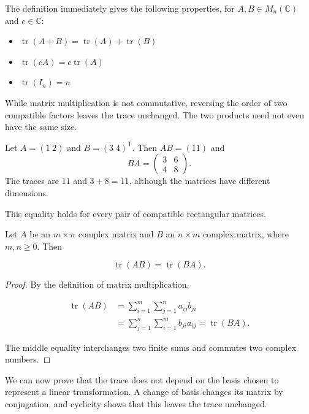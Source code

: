 The definition immediately gives the following properties, for $A,B\in M_n(\mathbb C)$ and $c\in\mathbb C$:

\begin{itemize}
    \item $\operatorname{tr}(A+B)=\operatorname{tr}(A)+\operatorname{tr}(B)$
    \item $\operatorname{tr}(cA)=c\operatorname{tr}(A)$
    \item $\operatorname{tr}(I_n)=n$
\end{itemize}

While matrix multiplication is not commutative, reversing the order of two compatible factors leaves the trace unchanged. The two products need not even have the same size.

\begin{example}
Let $A=(1\;2)$ and $B=(3\;4)^{\mathsf{T}}$. Then $AB=(11)$ and
\[
BA=\begin{pmatrix}3&6\\4&8\end{pmatrix}.
\]
The traces are $11$ and $3+8=11$, although the matrices have different dimensions.
\end{example}

This equality holds for every pair of compatible rectangular matrices.

\begin{proposition}\label{linear-algebra.trace-cyclic}

Let $A$ be an $m\times n$ complex matrix and $B$ an $n\times m$ complex matrix, where $m,n\geq0$. Then

\[
\operatorname{tr}(AB)=\operatorname{tr}(BA).
\]
\end{proposition}

\begin{proof} By the definition of matrix multiplication,

\[
\begin{aligned}
\operatorname{tr}(AB)
&=\sum_{i=1}^{m}\sum_{j=1}^{n}a_{ij}b_{ji}\\
&=\sum_{j=1}^{n}\sum_{i=1}^{m}b_{ji}a_{ij}
=\operatorname{tr}(BA).
\end{aligned}
\]

The middle equality interchanges two finite sums and commutes two complex numbers.
\end{proof}

We can now prove that the trace does not depend on the basis chosen to represent a linear transformation. A change of basis changes its matrix by conjugation, and cyclicity shows that this leaves the trace unchanged.

